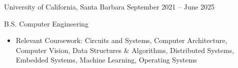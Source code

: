 \documentclass[9pt]{developercv} %
\begin{document}
\begin{entrylist}
    \vspace{-4pt}
    \entry
		{}
		{University of California, Santa Barbara}
		{September 2021 – June 2025}
		{B.S. Computer Engineering
        \begin{itemize}[noitemsep,topsep=0pt,parsep=0pt,partopsep=0pt, leftmargin=10pt]
            \item Relevant Coursework: Circuits and Systems, Computer Architecture, Computer Vision, Data Structures \& Algorithms, Distributed Systems, Embedded Systems, Machine Learning, Operating Systems
        \end{itemize}}
\end{entrylist}
\vspace{-10pt}
\end{document}
